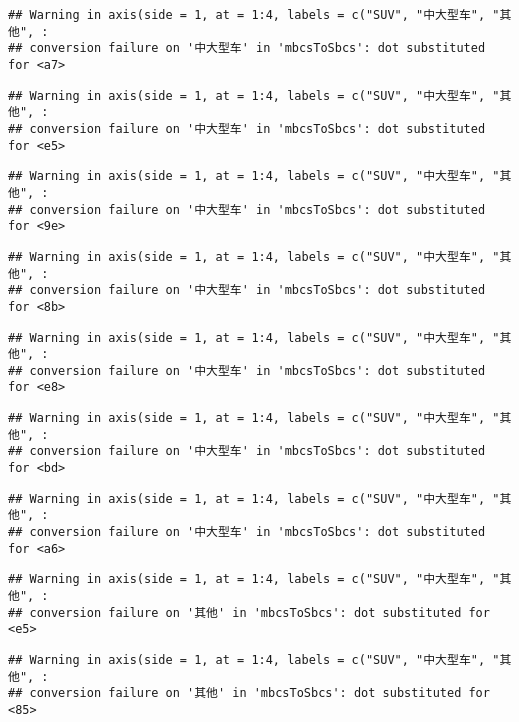 \documentclass[]{article}
\begin{document}
\begin{verbatim}
## Warning in axis(side = 1, at = 1:4, labels = c("SUV", "中大型车", "其他", :
## conversion failure on '中大型车' in 'mbcsToSbcs': dot substituted for <a7>
\end{verbatim}

\begin{verbatim}
## Warning in axis(side = 1, at = 1:4, labels = c("SUV", "中大型车", "其他", :
## conversion failure on '中大型车' in 'mbcsToSbcs': dot substituted for <e5>
\end{verbatim}

\begin{verbatim}
## Warning in axis(side = 1, at = 1:4, labels = c("SUV", "中大型车", "其他", :
## conversion failure on '中大型车' in 'mbcsToSbcs': dot substituted for <9e>
\end{verbatim}

\begin{verbatim}
## Warning in axis(side = 1, at = 1:4, labels = c("SUV", "中大型车", "其他", :
## conversion failure on '中大型车' in 'mbcsToSbcs': dot substituted for <8b>
\end{verbatim}

\begin{verbatim}
## Warning in axis(side = 1, at = 1:4, labels = c("SUV", "中大型车", "其他", :
## conversion failure on '中大型车' in 'mbcsToSbcs': dot substituted for <e8>
\end{verbatim}

\begin{verbatim}
## Warning in axis(side = 1, at = 1:4, labels = c("SUV", "中大型车", "其他", :
## conversion failure on '中大型车' in 'mbcsToSbcs': dot substituted for <bd>
\end{verbatim}

\begin{verbatim}
## Warning in axis(side = 1, at = 1:4, labels = c("SUV", "中大型车", "其他", :
## conversion failure on '中大型车' in 'mbcsToSbcs': dot substituted for <a6>
\end{verbatim}

\begin{verbatim}
## Warning in axis(side = 1, at = 1:4, labels = c("SUV", "中大型车", "其他", :
## conversion failure on '其他' in 'mbcsToSbcs': dot substituted for <e5>
\end{verbatim}

\begin{verbatim}
## Warning in axis(side = 1, at = 1:4, labels = c("SUV", "中大型车", "其他", :
## conversion failure on '其他' in 'mbcsToSbcs': dot substituted for <85>
\end{verbatim}
\end{document}
